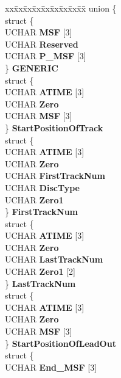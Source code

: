 \begin{DoxyCompactItemize}
\begin{tabbing}
\end{tabbing}\item 
\mbox{\label{struct___t_o_c___s_e_s___i_n_f_o_a54df96ec21affad343238ce0d6360df6}} 
\begin{tabbing}
xx\=xx\=xx\=xx\=xx\=xx\=xx\=xx\=xx\=\kill
union \{\\
\>struct \{\\
\>\>UCHAR {\bfseries MSF} \mbox{[}3\mbox{]}\\
\>\>UCHAR {\bfseries Reserved}\\
\>\>UCHAR {\bfseries P\_MSF} \mbox{[}3\mbox{]}\\
\>\} {\bfseries GENERIC}\\
\>struct \{\\
\>\>UCHAR {\bfseries ATIME} \mbox{[}3\mbox{]}\\
\>\>UCHAR {\bfseries Zero}\\
\>\>UCHAR {\bfseries MSF} \mbox{[}3\mbox{]}\\
\>\} {\bfseries StartPositionOfTrack}\\
\>struct \{\\
\>\>UCHAR {\bfseries ATIME} \mbox{[}3\mbox{]}\\
\>\>UCHAR {\bfseries Zero}\\
\>\>UCHAR {\bfseries FirstTrackNum}\\
\>\>UCHAR {\bfseries DiscType}\\
\>\>UCHAR {\bfseries Zero1}\\
\>\} {\bfseries FirstTrackNum}\\
\>struct \{\\
\>\>UCHAR {\bfseries ATIME} \mbox{[}3\mbox{]}\\
\>\>UCHAR {\bfseries Zero}\\
\>\>UCHAR {\bfseries LastTrackNum}\\
\>\>UCHAR {\bfseries Zero1} \mbox{[}2\mbox{]}\\
\>\} {\bfseries LastTrackNum}\\
\>struct \{\\
\>\>UCHAR {\bfseries ATIME} \mbox{[}3\mbox{]}\\
\>\>UCHAR {\bfseries Zero}\\
\>\>UCHAR {\bfseries MSF} \mbox{[}3\mbox{]}\\
\>\} {\bfseries StartPositionOfLeadOut}\\
\>struct \{\\
\>\>UCHAR {\bfseries End\_MSF} \mbox{[}3\mbox{]}\\

\end{tabbing}
\end{DoxyCompactItemize}
